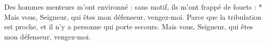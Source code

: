 Des hommes menteurs m’ont environné : sans motif, ils m’ont frappé de fouets :
* Mais vous, Seigneur, qui êtes mon défenseur, vengez-moi.
\versseparator
Parce que la tribulation est proche, et il n’y a personne qui porte secours.
\versseparator
Mais vous, Seigneur, qui êtes mon défenseur, vengez-moi.
